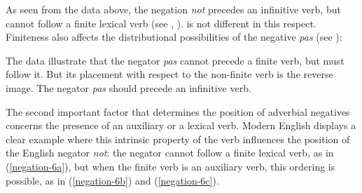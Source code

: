 \documentclass[output=paper
	        ,collection
	        ,collectionchapter
 	        ,biblatex
                ,babelshorthands
                ,newtxmath
                ,draftmode
                ,colorlinks, citecolor=brown
]{langscibook}
\begin{document}
\begin{exe}
\ex\label{negation-eng-fin-neg} \begin{xlist}
\zl


\begin{exe}
\ex\label{negation-fr-fin-neg} \begin{xlist}
\zl
%
\noindent As seen from the data above, the negation \textit{not} precedes an infinitive verb, but cannot follow
a finite lexical  verb (see \citealt[Chapter~15]{Baker:89}, \citealt{Baker:91,Ernst:92}).
 is not different in this respect. Finiteness also affects the distributional possibilities of the  negative \emph{pas} (see \citealt{AG:97, KS:02, Zeijlstra:15}):

\eal
{}
\zl

\eal{}
\zl

\noindent
The data illustrate that the negator \textit{pas} cannot precede a finite verb,
but must follow it. But its placement with respect to
the non-finite verb is the reverse image. The negator \textit{pas}
should precede an infinitive verb.

The second important factor that determines the position of adverbial
negatives concerns the presence of an auxiliary or a lexical  verb.
Modern English displays a clear example where this
intrinsic property of the verb influences the position of
the English negator \textit{not}: the negator cannot follow
a finite lexical  verb, as in (\ref{negation-6a}), but when the finite verb is an auxiliary verb,
this ordering is possible, as in (\ref{negation-6b}) and (\ref{negation-6c}).


\end{xlist}
\end{exe}
\end{xlist}
\end{exe}
\end{document}
